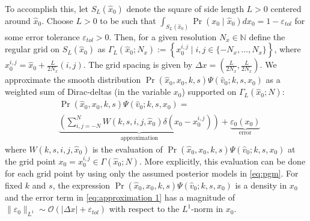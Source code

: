 \documentclass[letterpaper,10pt,conference]{ieeeconf}
\begin{document}
 To accomplish this, let $S_L(\hat{x}_0)$ denote the square of side length $L>0$ centered around $\hat{x}_0$.
 Choose  $L>0$ to be such that $\int_{S_L(\hat{x}_0)} \Pr( x_0 \mid \hat{x}_0) dx_0 = 1 - \varepsilon_{tol}$ for some error tolerance $\varepsilon_{tol}>0$.
 Then, for a given resolution $N_x \in \mathbb{N}$ define the regular grid on $S_L(\hat{x}_0)$ as $\Gamma_L( \hat{x}_0 ; N_x ) := \left\{ x_0^{i,j} \mid i,j \in \{ -N_x,\dots,N_x \} \right\}$, where $x_0^{i,j} = \hat{x}_0 + \frac{L}{2N_x}(i,j)$.
 The grid spacing is given by $\Delta x = ( \frac{L}{2N_x}, \frac{L}{2N_x} )$.
We approximate the smooth distribution $\Pr(\hat{x}_0, x_0, k, s) \Psi( \hat{v}_0 ; k, s, x_0 )$ as a weighted sum of Dirac-deltas (in the variable $x_0$) supported on $\Gamma_L( \hat{x}_0;N)$:
\begin{align}
		&\Pr(\hat{x}_0, x_0, k, s) \Psi( \hat{v}_0 ; k, s, x_0 ) = \nonumber \\
		& \underbrace{\left( \sum_{i,j=-N}^{N} W(k,s,i,j,\hat{x}_0) \delta( x_0 - x_0^{i,j} ) \right)}_{\text{approximation}}
		+ \underbrace{ \varepsilon_0(x_0) }_{\text{error}}
	\label{eq:approximation 1}
\end{align}
where $W(k,s,i,j,\hat{x}_0)$ is the evaluation of $\Pr(\hat{x}_0, x_0, k, s) \Psi( \hat{v}_0 ; k, s, x_0 )$ at the grid point $x_0 = x_0^{i,j} \in \Gamma( \hat{x}_0; N)$.
More explicitly, this evaluation can be done for each grid point by using only the assumed posterior models in \eqref{eq:pgm}.
For fixed $k$ and $s$, the expression $\Pr(\hat{x}_0, x_0, k, s) \Psi( \hat{v}_0 ; k, s, x_0 )$ is a density in $x_0$ and the error term in \eqref{eq:approximation 1} has a magnitude of $\| \varepsilon_0 \|_{L^1} \sim \mathcal{O}( | \Delta x |  + \varepsilon_{tol} )$ with respect to the $L^1$-norm in $x_0$.
\end{document}
